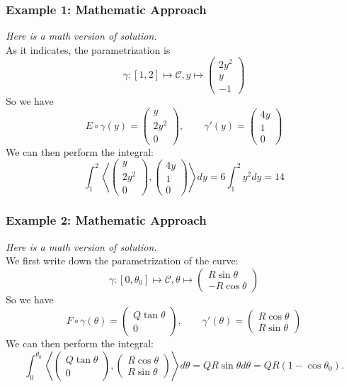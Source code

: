 \documentclass[11pt, t]{beamer}
\newcommand{\nullspace}{~\\[15pt]}
\begin{document}
\begin{frame}
    \frametitle{Example 1: Mathematic Approach}
    \textit{Here is a math version of solution.}\nullspace
    As it indicates, the parametrization is $$\gamma:[1,2]\mapsto\mathcal{C},y\mapsto\begin{pmatrix}2y^2 \\      y\\
            -1
        \end{pmatrix}$$
    So we have $$E\circ\gamma(y)=\begin{pmatrix}
            y    \\
            2y^2 \\
            0
        \end{pmatrix},\qquad \gamma'(y)=\begin{pmatrix}
            4y \\
            1  \\
            0
        \end{pmatrix}$$
    We can then perform the integral:
    $$ \int_{1}^{2}\left\langle\begin{pmatrix}
            y    \\
            2y^2 \\
            0
        \end{pmatrix},\begin{pmatrix}
            4y \\
            1  \\
            0
        \end{pmatrix}\right\rangle dy=6\int_{1}^{2}y^2dy=14$$
\end{frame}

\begin{frame}
    \frametitle{Example 2: Mathematic Approach}
    \textit{Here is a math version of solution.}\nullspace
    We first write down the parametrization of the curve: $$\gamma:[0,\theta_0]\mapsto\mathcal{C},\theta\mapsto\begin{pmatrix}R\sin\theta \\ -R\cos\theta
        \end{pmatrix}$$
    So we have
    $$F\circ\gamma(\theta)=\begin{pmatrix}Q\tan\theta \\ 0
        \end{pmatrix},\qquad \gamma'(\theta)=\begin{pmatrix}R\cos\theta \\ R\sin\theta
        \end{pmatrix}$$
    We can then perform the integral:
    $$ \int_{0}^{\theta_0} \left\langle\begin{pmatrix}Q\tan\theta \\ 0
        \end{pmatrix},\begin{pmatrix}R\cos\theta \\ R\sin\theta
        \end{pmatrix}\right\rangle d\theta=QR\sin\theta d\theta=QR(1-\cos\theta_0).$$

\end{frame}
\end{document}

